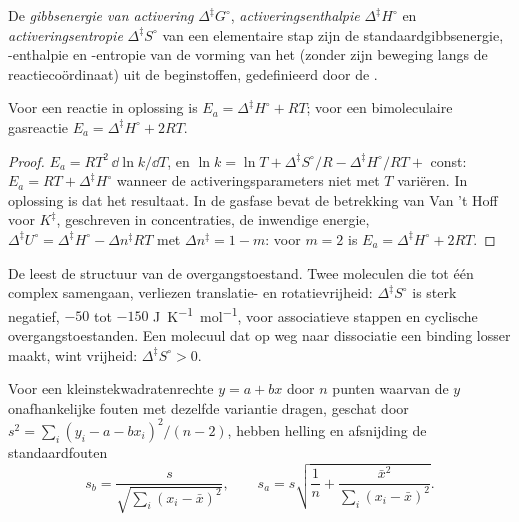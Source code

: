 \begin{definition}\label{def:b3:rate-theories:activation}
De \emph{gibbsenergie van activering}
$\Delta^{\ddagger}G^\circ$, \emph{activeringsenthalpie} $\Delta^{\ddagger}H^\circ$ en
\emph{activeringsentropie} $\Delta^{\ddagger}S^\circ$
van een elementaire stap zijn de standaardgibbsenergie, -enthalpie en
-entropie van de vorming van het  (zonder zijn
beweging langs de reactiecoördinaat) uit de beginstoffen, gedefinieerd
door de .
\end{definition}

\begin{proposition}\label{prop:b3:rate-theories:ea-dh}
Voor een reactie in oplossing is $E_a = \Delta^{\ddagger}H^\circ + RT$; voor
een bimoleculaire gasreactie
$E_a = \Delta^{\ddagger}H^\circ + 2RT$.
\end{proposition}

\begin{proof}
$E_a = RT^2\,\dd\ln k/\dd T$, en $\ln k = \ln T + \Delta^{\ddagger}S^\circ/R - \Delta^{\ddagger}H^\circ/RT + $ const: $E_a =
RT + \Delta^{\ddagger}H^\circ$ wanneer de activeringsparameters niet met $T$
variëren. In oplossing is dat het resultaat. In de gasfase bevat de
betrekking van Van 't Hoff voor $K^{\ddagger}$, geschreven in concentraties,
de inwendige energie, $\Delta^{\ddagger}U^\circ = \Delta^{\ddagger}H^\circ - \Delta n^{\ddagger}RT$
met $\Delta n^{\ddagger} = 1 - m$: voor $m = 2$ is $E_a = \Delta^{\ddagger}H^\circ + 2RT$.
\end{proof}

De  leest de structuur van de overgangstoestand. Twee
moleculen die tot één complex samengaan, verliezen translatie- en
rotatievrijheid: $\Delta^{\ddagger}S^\circ$ is sterk negatief, $-50$ tot
$-150$ \unit{J.K^{-1}.mol^{-1}}, voor associatieve stappen en cyclische
overgangstoestanden. Een molecuul dat op weg naar dissociatie een binding
losser maakt, wint vrijheid: $\Delta^{\ddagger}S^\circ > 0$.

\begin{proposition}\label{prop:b3:rate-theories:slope-uncertainty}
Voor een kleinstekwadratenrechte $y = a + bx$ door $n$ punten waarvan de
$y$ onafhankelijke fouten met dezelfde variantie dragen, geschat door $s^2 = \sum_i(y_i - a - bx_i)^2/(n - 2)$,
hebben helling en afsnijding de standaardfouten
\[
  s_b = \frac{s}{\sqrt{\sum_i(x_i - \bar x)^2}}, \qquad
  s_a = s\sqrt{\frac1n + \frac{\bar x^2}{\sum_i(x_i - \bar x)^2}} .
\]
\end{proposition}

